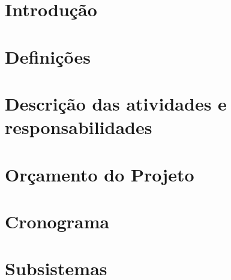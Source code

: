 \chapter{Introdução}


\chapter{Definições}


\chapter{Descrição das atividades e responsabilidades}


\openany

\chapter{Orçamento do Projeto}


\chapter{Cronograma}


\chapter{Subsistemas}

